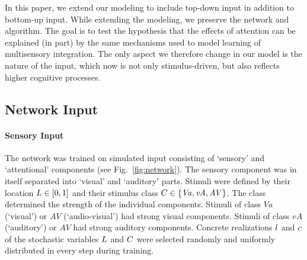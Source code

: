 In this paper, we extend our modeling to include top-down input in addition to bottom-up input.
While extending the modeling, we preserve the network and algorithm.
The goal is to test the hypothesis that the effects of attention can be explained (in part) by the same mechanisms used to model learning of multisensory integration.
The only aspect we therefore change in our model is the nature of the input, which now is not only stimulus-driven, but also reflects higher cognitive processes.

\subsection{Network Input}

    \paragraph{Sensory Input}
        The network was trained on simulated input consisting of `sensory' and `attentional' components (see Fig.~\ref{fig:network}).
        The sensory component was in itself separated into `visual' and `auditory' parts.
        Stimuli were defined by their location $L\in [0,1]$ and their stimulus class $C\in\{\mathit{Va}, \mathit{vA}, \mathit{AV}\}$.
        The class determined the strength of the individual components.
        Stimuli of class $\mathit{Va}$ (`visual') or $\mathit{AV}$ (`audio-visual') had strong visual components.
        Stimuli of class $\mathit{vA}$ (`auditory') or $\mathit{AV}$ had strong auditory components.
        Concrete realizations $l$ and $c$ of the stochastic variables $L$ and $C$ were selected randomly and uniformly distributed in every step during training.

